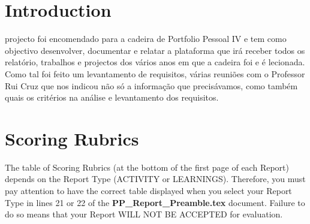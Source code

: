 \documentclass[a4paper,12pt,journal,twoside,compsoc]{PPIEEEtran}
\begin{document}

\maketitle

\IEEEdisplaynontitleabstractindextext
\IEEEpeerreviewmaketitle
\section{Introduction}
% 
% 
 projecto foi encomendado para a cadeira de Portfolio Pessoal IV e tem como objectivo desenvolver, documentar e relatar a plataforma que irá receber todos os relatório, trabalhos e projectos dos vários anos em que a cadeira foi e é lecionada. Como tal foi feito um levantamento de requisitos, várias reuniões com o Professor Rui Cruz que nos indicou não só a informação que precisávamos, como também quais os critérios na análise e levantamento dos requisitos.
\section{Scoring Rubrics}
The table of Scoring Rubrics (at the bottom of the first page of each Report) depends on the Report Type (ACTIVITY or LEARNINGS). Therefore, you must pay attention to have the correct table displayed when you select your Report Type in lines 21 or 22 of the \textbf{PP\_Report\_Preamble.tex} document. Failure to do so means that your Report WILL NOT BE ACCEPTED for evaluation.
\end{document}
